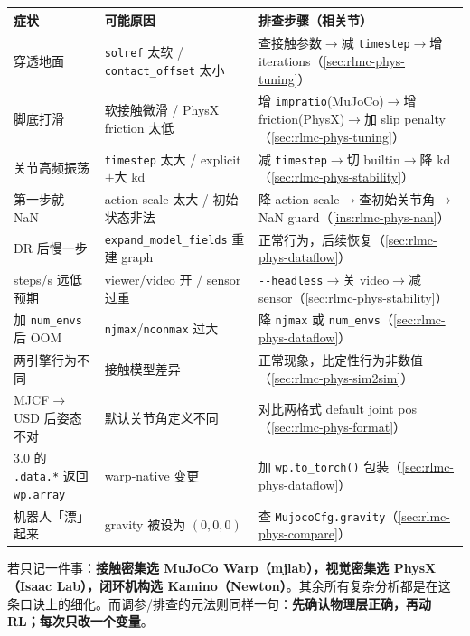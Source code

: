 \begin{center}
\small
\begin{tabular}{@{}p{3.4cm}p{4.0cm}p{4.4cm}@{}}
\toprule
症状 & 可能原因 & 排查步骤（相关节） \\
\midrule
穿透地面 & \verb|solref| 太软 / \verb|contact_offset| 太小 & 查接触参数$\to$减 \verb|timestep|$\to$增 iterations（\cref{sec:rlmc-phys-tuning}） \\
脚底打滑 & 软接触微滑 / PhysX friction 太低 & 增 \verb|impratio|(MuJoCo)$\to$增 friction(PhysX)$\to$加 slip penalty（\cref{sec:rlmc-phys-tuning}） \\
关节高频振荡 & \verb|timestep| 太大 / explicit$+$大 kd & 减 \verb|timestep|$\to$切 builtin$\to$降 kd（\cref{sec:rlmc-phys-stability}） \\
第一步就 NaN & action scale 太大 / 初始状态非法 & 降 action scale$\to$查初始关节角$\to$NaN guard（\cref{ins:rlmc-phys-nan}） \\
DR 后慢一步 & \verb|expand_model_fields| 重建 graph & 正常行为，后续恢复（\cref{sec:rlmc-phys-dataflow}） \\
steps/s 远低预期 & viewer/video 开 / sensor 过重 & \verb|--headless|$\to$关 video$\to$减 sensor（\cref{sec:rlmc-phys-stability}） \\
加 \verb|num_envs| 后 OOM & \verb|njmax|/\verb|nconmax| 过大 & 降 \verb|njmax| 或 \verb|num_envs|（\cref{sec:rlmc-phys-dataflow}） \\
两引擎行为不同 & 接触模型差异 & 正常现象，比定性行为非数值（\cref{sec:rlmc-phys-sim2sim}） \\
MJCF$\to$USD 后姿态不对 & 默认关节角定义不同 & 对比两格式 default joint pos（\cref{sec:rlmc-phys-format}） \\
3.0 的 \verb|.data.*| 返回 \verb|wp.array| & warp-native 变更 & 加 \verb|wp.to_torch()| 包装（\cref{sec:rlmc-phys-dataflow}） \\
机器人「漂」起来 & gravity 被设为 $(0,0,0)$ & 查 \verb|MujocoCfg.gravity|（\cref{sec:rlmc-phys-compare}） \\
\bottomrule
\end{tabular}
\end{center}

\begin{insight}[最后一句话选型口诀]\label{ins:rlmc-phys-oneliner}
若只记一件事：\textbf{接触密集选 MuJoCo Warp（mjlab），视觉密集选 PhysX（Isaac Lab），闭环机构选 Kamino（Newton）}。其余所有复杂分析都是在这条口诀上的细化。而调参/排查的元法则同样一句：\textbf{先确认物理层正确，再动 RL；每次只改一个变量}。
\end{insight}

